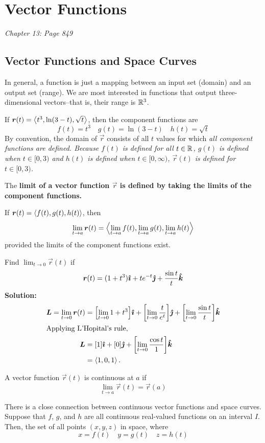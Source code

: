 \section{Vector Functions}
\textit{Chapter 13: Page 849}
\subsection{Vector Functions and Space Curves}
In general, a function is just a mapping between an input set (domain) and an output set (range). We are most interested in functions that output three-dimensional vectors--that is, their range is \(\mathbb{R}^3\). 
\begin{example}
    If \(\boldsymbol{r}(t) = \left\langle t^3, \ln(3-t), \sqrt t\right\rangle\), then the component functions are 
    \[f(t)=t^3\quad g(t)=\ln(3-t)\quad h(t)=\sqrt t\]
    By convention, the domain of \(\vec r\) consists of all \(t\) values for which \it{all} component functions are defined. Because \(f(t)\) is defined for all \(t\in\mathbb{R}\), \(g(t)\) is defined when \(t\in[0, 3)\) and \(h(t)\) is defined when \(t\in[0, \infty)\), \(\vec r(t)\) is defined for \(t\in [0, 3)\).
\end{example}
The \bf{limit} of a vector function \(\vec r\) is defined by taking the limits of the component functions.
\begin{definition}
    If \(\boldsymbol{r}(t)=\left\langle f(t), g(t), h(t)\right\rangle\), then
    \[\lim_{t\to a}\boldsymbol{r}(t) = \left\langle\lim_{t\to a}f(t), \lim_{t\to a}g(t), \lim_{t\to a}h(t)\right\rangle\] provided the limits of the component functions exist.
\end{definition}
\begin{example}
    Find \(\lim_{t\to0}\vec r(t)\) if \[ \boldsymbol{r}(t)=(1+t^3)\boldsymbol{\hat{\imath}} + te^{-t}\boldsymbol{\hat{\jmath}} + \frac{\sin t}{t}\boldsymbol{\hat{k}} \]\bf{Solution: }
    \begin{align*}
        \vec L = \lim_{t\to0}\vec r(t) &= \bqty{\lim_{t\to 0}1+t^3}\ihat + \bqty{\lim_{t\to 0}\frac{t}{e^t}}\jhat + \bqty{\lim_{t\to 0}\frac{\sin t}{t}}\khat \\
        \intertext{Applying L'Hopital's rule,}
        \vec L &= \bqty{1}\ihat + \bqty{0}\jhat + \bqty{\lim_{t\to 0}\frac{\cos t}{1}}\khat \\
        &= \<1, 0, 1\>.
    \end{align*}
\end{example}
\begin{definition}
    A vector function \(\vec r(t)\) is continuous at \(a\) if 
    \[ \lim_{t\to a}\vec r(t) = \vec r(a) \]
\end{definition}
There is a close connection between continuous vector functions and space curves. Suppose that \(f\), \(g\), and \(h\) are all continuous real-valued functions on an interval \(I\). Then, the set of all points \((x,y,z)\) in space, where \[ x=f(t)\quad y=g(t)\quad z=h(t) \]
